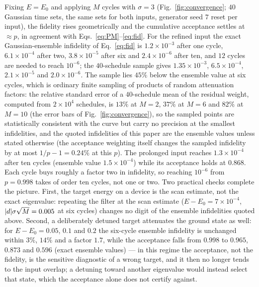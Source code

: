 \documentclass[
  aps,            %
  prc,            %
  reprint,        %
  superscriptaddress,
  floatfix,
  nofootinbib
]{revtex4-2}
\begin{document}
Fixing $E=E_0$ and applying $M$ cycles with $\sigma=3$
(Fig.~\ref{fig:convergence}; $40$ Gaussian time sets, the same sets for both
inputs, generator seed $7$ reset per input), the fidelity rises geometrically
and the cumulative acceptance settles at $\approx p$, in agreement with
Eqs.~\eqref{eq:PM}--\eqref{eq:fid}.  For the refined input the exact
Gaussian-ensemble infidelity of Eq.~\eqref{eq:fid} is $1.2\times10^{-3}$
after one cycle, $6.1\times10^{-4}$ after two, $3.8\times10^{-5}$ after six
and $2.4\times10^{-6}$ after ten, and $12$ cycles are needed to reach
$10^{-6}$; the $40$-schedule sample gives $1.35\times10^{-3}$,
$6.5\times10^{-4}$, $2.1\times10^{-5}$ and $2.0\times10^{-6}$.  The sample
lies $45\%$ below the ensemble value at six cycles, which is ordinary finite
sampling of products of random attenuation factors: the relative standard
error of a $40$-schedule mean of the residual weight, computed from
$2\times10^{4}$ schedules, is $13\%$ at $M=2$, $37\%$ at $M=6$ and $82\%$ at
$M=10$ (the error bars of Fig.~\ref{fig:convergence}), so the sampled points
are statistically consistent with the curve but carry no precision at the
smallest infidelities, and the quoted infidelities of this paper are the
ensemble values unless stated otherwise (the acceptance weighting itself
changes the sampled infidelity by at most $1/p-1=0.24\%$ at this $p$).  The
prolonged input reaches $1.3\times10^{-4}$ after ten cycles (ensemble value
$1.5\times10^{-4}$) while its acceptance holds at $0.868$.  Each cycle buys
roughly a factor two in infidelity, so reaching $10^{-6}$ from $p=0.998$
takes of order ten cycles, not one or two.  Two practical checks complete
the picture.  First, the target energy on a device is the scan estimate, not
the exact eigenvalue: repeating the filter at the scan estimate
($E-E_0=7\times10^{-4}$, $\abs{d}\sigma\sqrt M=0.005$ at six cycles)
changes no digit of the ensemble infidelities quoted above.  Second, a
deliberately detuned target attenuates the ground state as well: for
$E-E_0=0.05$, $0.1$ and $0.2$ the six-cycle ensemble infidelity is unchanged
within $3\%$, $14\%$ and a factor $1.7$, while the acceptance falls from
$0.998$ to $0.965$, $0.873$ and $0.596$ (exact ensemble values) --- in
this regime the acceptance, not the fidelity, is the sensitive diagnostic of
a wrong target, and it then no longer tends to the input overlap; a detuning
toward another eigenvalue would instead select that state, which the
acceptance alone does not certify against.
\end{document}
